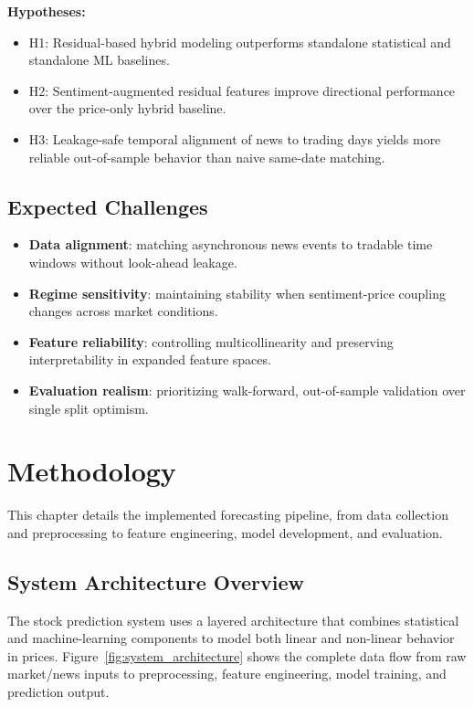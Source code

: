 \documentclass[12pt,a4paper]{article}
\begin{document}
\textbf{Hypotheses:}
\begin{itemize}
    \item H1: Residual-based hybrid modeling outperforms standalone statistical and standalone ML baselines.
    \item H2: Sentiment-augmented residual features improve directional performance over the price-only hybrid baseline.
    \item H3: Leakage-safe temporal alignment of news to trading days yields more reliable out-of-sample behavior than naive same-date matching.
\end{itemize}

\subsection{Expected Challenges}
\begin{itemize}
    \item \textbf{Data alignment}: matching asynchronous news events to tradable time windows without look-ahead leakage.
    \item \textbf{Regime sensitivity}: maintaining stability when sentiment-price coupling changes across market conditions.
    \item \textbf{Feature reliability}: controlling multicollinearity and preserving interpretability in expanded feature spaces.
    \item \textbf{Evaluation realism}: prioritizing walk-forward, out-of-sample validation over single split optimism.
\end{itemize}

\newpage

\section{Methodology}

This chapter details the implemented forecasting pipeline, from data collection and preprocessing to feature engineering, model development, and evaluation.

\subsection{System Architecture Overview}

The stock prediction system uses a layered architecture that combines statistical and machine-learning components to model both linear and non-linear behavior in prices. Figure~\ref{fig:system_architecture} shows the complete data flow from raw market/news inputs to preprocessing, feature engineering, model training, and prediction output.
\end{document}
